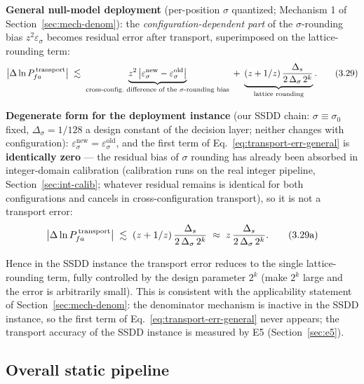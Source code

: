 \textbf{General null-model deployment} (per-position $\sigma$ quantized; Mechanism 1 of Section~\ref{sec:mech-denom}): the \emph{configuration-dependent part} of the $\sigma$-rounding bias $z^2\varepsilon_\sigma$ becomes residual error after transport, superimposed on the lattice-rounding term:
\begin{equation}
\big|\Delta\ln \Pfa^{\,\mathrm{transport}}\big|
\;\lesssim\;
\underbrace{z^{2}\,\big|\varepsilon_\sigma^{\mathrm{new}}-\varepsilon_\sigma^{\mathrm{old}}\big|}_{\text{cross-config.\ difference of the $\sigma$-rounding bias}}
\;+\;
\underbrace{(z+1/z)\,\frac{\Delta_s}{2\,\Delta_\sigma\, 2^{k}}}_{\text{lattice rounding}} .
\tag{3.29}
\label{eq:transport-err-general}
\end{equation}

\textbf{Degenerate form for the deployment instance} (our SSDD chain: $\sigma\equiv\sigma_0$ fixed, $\Delta_\sigma=1/128$ a design constant of the decision layer; neither changes with configuration): $\varepsilon_\sigma^{\mathrm{new}}=\varepsilon_\sigma^{\mathrm{old}}$, and the first term of Eq.~\eqref{eq:transport-err-general} is \textbf{identically zero} --- the residual bias of $\sigma$ rounding has already been absorbed in integer-domain calibration (calibration runs on the real integer pipeline, Section~\ref{sec:int-calib}; whatever residual remains is identical for both configurations and cancels in cross-configuration transport), so it is not a transport error:
\begin{equation}
\big|\Delta\ln P_{fa}^{\,\mathrm{transport}}\big|
\;\lesssim\;(z+1/z)\,\frac{\Delta_s}{2\,\Delta_\sigma\, 2^{k}}
\;\approx\;z\,\frac{\Delta_s}{2\,\Delta_\sigma\, 2^{k}} .
\tag{3.29a}
\label{eq:transport-err-degenerate}
\end{equation}

Hence in the SSDD instance the transport error reduces to the single lattice-rounding term, fully controlled by the design parameter $2^{k}$ (make $2^k$ large and the error is arbitrarily small).
This is consistent with the applicability statement of Section~\ref{sec:mech-denom}: the denominator mechanism is inactive in the SSDD instance, so the first term of Eq.~\eqref{eq:transport-err-general} never appears; the transport accuracy of the SSDD instance is measured by E5 (Section~\ref{sec:e5}).

\subsection{Overall static pipeline}
\label{sec:pipeline}

